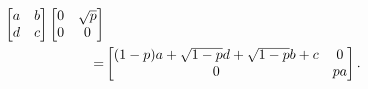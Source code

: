 \documentclass{assignment}
\begin{document}
\begin{sol}
\begin{itemize}
\begin{align}
\begin{bmatrix}
                a&b\\
                d&c
            \end{bmatrix}\begin{bmatrix}
                0&\sqrt{p}\\
                0&0
            \end{bmatrix}\\
            \notag=&\begin{bmatrix}
                (1-p)a+\sqrt{1-p}d+\sqrt{1-p}b+c&0\\
                0&pa
            \end{bmatrix}.
        \end{align}
    \end{itemize}
\end{sol}
\end{document}
